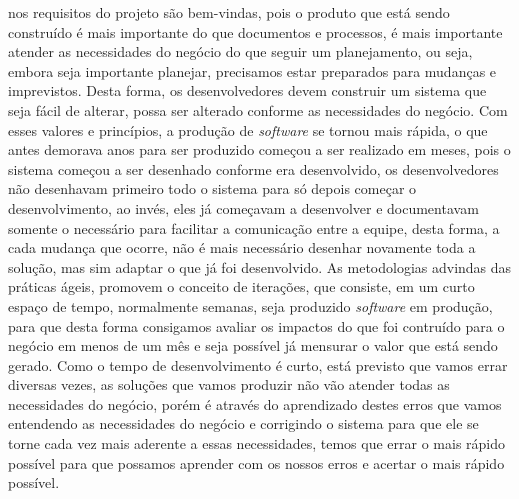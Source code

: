     nos requisitos do projeto são bem-vindas, pois o produto que está sendo
    construído é mais importante do que documentos e processos, é mais
    importante atender as necessidades do negócio do que seguir um planejamento,
    ou seja, embora seja importante planejar, precisamos estar preparados para
    mudanças e imprevistos. Desta forma, os desenvolvedores devem construir
    um sistema que seja fácil de alterar, possa ser alterado conforme as necessidades
    do negócio. \newline
    Com esses valores e princípios, a produção de \textit{software} se tornou
    mais rápida, o que antes demorava anos para ser produzido começou a ser
    realizado em meses, pois o sistema começou a ser desenhado conforme era
    desenvolvido, os desenvolvedores não desenhavam primeiro todo o sistema
    para só depois começar o desenvolvimento, ao invés, eles já começavam a
    desenvolver e documentavam somente o necessário para facilitar a comunicação
    entre a equipe, desta forma, a cada mudança que ocorre, não é mais necessário
    desenhar novamente toda a solução, mas sim adaptar o que já foi desenvolvido. \newline
    As metodologias advindas das práticas ágeis, promovem o conceito de iterações,
    que consiste, em um curto espaço de tempo, normalmente semanas, seja produzido
    \textit{software} em produção, para que desta forma consigamos avaliar os impactos
    do que foi contruído para o negócio em menos de um mês e seja possível já mensurar
    o valor que está sendo gerado. Como o tempo de desenvolvimento é curto, está
    previsto que vamos errar diversas vezes, as soluções que vamos produzir não
    vão atender todas as necessidades do negócio, porém é através do aprendizado
    destes erros que vamos entendendo as necessidades do negócio e corrigindo o
    sistema para que ele se torne cada vez mais aderente a essas necessidades,
    temos que errar o mais rápido possível para que possamos aprender com os nossos
    erros e acertar o mais rápido possível.

